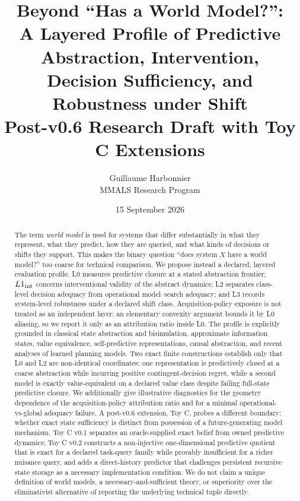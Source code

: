 \documentclass[10pt]{article}
\title{\textbf{Beyond ``Has a World Model?'':}\\
A Layered Profile of Predictive Abstraction, Intervention,\\
Decision Sufficiency, and Robustness under Shift\\[0.35em]
\large Post-v0.6 Research Draft with Toy C Extensions}
\author{Guillaume Harbonnier\\MMALS Research Program}
\date{15 September 2026}
\begin{document}
\maketitle

\begin{abstract}
The term \emph{world model} is used for systems that differ substantially in what they represent, what they predict, how they are queried, and what kinds of decisions or shifts they support. This makes the binary question ``does system $X$ have a world model?'' too coarse for technical comparison. We propose instead a declared, layered evaluation profile. L0 measures predictive closure at a stated abstraction frontier; $L1_{\rm int}$ concerns interventional validity of the abstract dynamics; L2 separates class-level decision adequacy from operational model--search adequacy; and L3 records system-level robustness under a declared shift class. Acquisition-policy exposure is not treated as an independent layer: an elementary convexity argument bounds it by L0 aliasing, so we report it only as an attribution ratio inside L0. The profile is explicitly grounded in classical state abstraction and bisimulation, approximate information states, value equivalence, self-predictive representations, causal abstraction, and recent analyses of learned planning models. Two exact finite constructions establish only that L0 and L2 are non-identical coordinates: one representation is predictively closed at a coarse abstraction while incurring positive contingent-decision regret, while a second model is exactly value-equivalent on a declared value class despite failing full-state predictive closure. We additionally give illustrative diagnostics for the geometry dependence of the acquisition-policy attribution ratio and for a minimal operational-vs-global adequacy failure. A post-v0.6 extension, Toy C, probes a different boundary: whether exact state sufficiency is distinct from possession of a future-generating model mechanism. Toy C v0.1 separates an oracle-supplied exact belief from owned predictive dynamics; Toy C v0.2 constructs a non-injective one-dimensional predictive quotient that is exact for a declared task-query family while provably insufficient for a richer nuisance query, and adds a direct-history predictor that challenges persistent recursive state storage as a necessary implementation condition. We do not claim a unique definition of world models, a necessary-and-sufficient theory, or superiority over the eliminativist alternative of reporting the underlying technical tuple directly.
\end{abstract}
\end{document}
